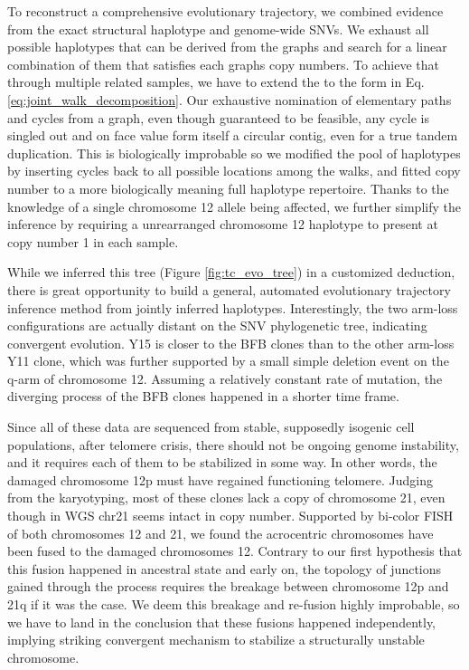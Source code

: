 \documentclass[phd,tocprelim]{cornell}
\begin{document}
To reconstruct a comprehensive evolutionary trajectory, we combined evidence from the exact structural haplotype and genome-wide SNVs. We exhaust all possible haplotypes that can be derived from the graphs and search for a linear combination of them that satisfies each graphs copy numbers. To achieve that through multiple related samples, we have to extend the  to the form in Eq. \ref{eq:joint_walk_decomposition}. Our exhaustive nomination of elementary paths and cycles from a graph, even though guaranteed to be feasible, any cycle is singled out and on face value form itself a circular contig, even for a true tandem duplication. This is biologically improbable so we modified the pool of haplotypes by inserting cycles back to all possible locations among the walks, and fitted copy number to a more biologically meaning full haplotype repertoire. Thanks to the knowledge of a single chromosome 12 allele being affected, we further simplify the inference by requiring a unrearranged chromosome 12 haplotype to present at copy number 1 in each sample.

While we inferred this tree (Figure \ref{fig:tc_evo_tree}) in a customized deduction, there is great opportunity to build a general, automated evolutionary trajectory inference method from jointly inferred haplotypes. Interestingly, the two arm-loss configurations are actually distant on the SNV phylogenetic tree, indicating convergent evolution. Y15 is closer to the BFB clones than to the other arm-loss Y11 clone, which was further supported by a small simple deletion event on the q-arm of chromosome 12. Assuming a relatively constant rate of mutation, the diverging process of the BFB clones happened in a shorter time frame. 

Since all of these data are sequenced from stable, supposedly isogenic cell populations, after telomere crisis, there should not be ongoing genome instability, and it requires each of them to be stabilized in some way. In other words, the damaged chromosome 12p must have regained functioning telomere. Judging from the karyotyping, most of these clones lack a copy of chromosome 21, even though in WGS chr21 seems intact in copy number. Supported by bi-color FISH of both chromosomes 12 and 21, we found the acrocentric chromosomes have been fused to the damaged chromosomes 12. Contrary to our first hypothesis that this fusion happened in ancestral state and early on, the topology of junctions gained through the process requires the breakage between chromosome 12p and 21q if it was the case. We deem this breakage and re-fusion highly improbable, so we have to land in the conclusion that these fusions happened independently, implying striking convergent mechanism to stabilize a structurally unstable chromosome. 
\end{document}
